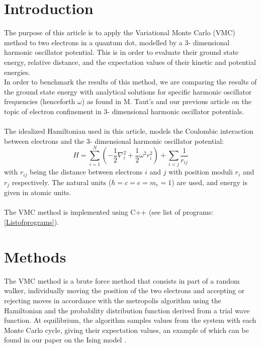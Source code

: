 \documentclass[10pt,a4paper]{article}
\begin{document}
\section{Introduction}
The purpose of this article is to apply the Variational Monte Carlo (VMC) method to two electrons in a quantum dot, modelled by a 3- dimensional harmonic oscillator potential. This is in order to evaluate their ground state energy, relative distance, and the expectation values of their kinetic and potential energies.\\In order to benchmark the results of this method, we are comparing the results of the ground state energy with analytical solutions for specific harmonic oscillator frequencies (henceforth $\omega$) as found in M. Taut's \cite{PhysRevA.48.3561} and our previous article \cite{Project2} on the topic of electron confinement in 3- dimensional harmonic oscillator potentials.\\\\The idealized Hamiltonian used in this article, models the Coulombic interaction between electrons and the 3- dimensional harmonic oscillator potential: 
\begin{equation}
  \label{eq:finalH}
  \hat{H}=\sum_{i=1}^{N} \left(  -\frac{1}{2} \nabla_i^2 + \frac{1}{2} \omega^2r_i^2  \right)+\sum_{i<j}\frac{1}{r_{ij}}
\end{equation}
\cite{Problem_set_5} with $r_{ij}$ being the distance between electrons $i$ and $j$ with position moduli $r_i$ and $r_j$ respectively. The natural units ($\hbar = c = e = m_e =1$) are used, and energy is given in atomic units. \\\\The VMC method is implemented using C++ (see list of programs: \ref{Listofprograms}).
\section{Methods}
The VMC method is a brute force method that consists in part of a random walker, individually moving the position of the two electrons and accepting or rejecting moves in accordance with the metropolis algorithm using the Hamiltonian and the probability distribution function derived from a trial wave function. At equilibrium, the algorithm samples values from the system with each Monte Carlo cycle, giving their expectation values, an example of which can be found in our paper on the Ising model \cite{Project4}.
\end{document}
